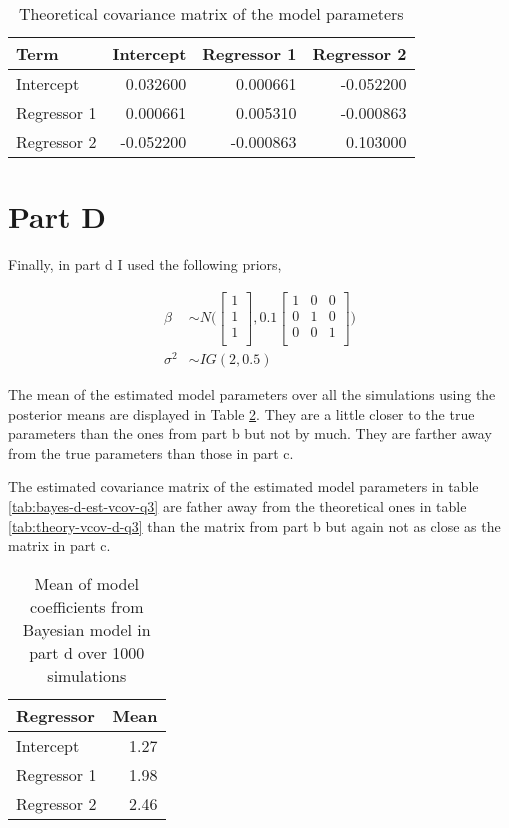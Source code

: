 \documentclass[]{book}
\begin{document}
\begin{table}

\caption{\label{tab:theory-vcov-c-q3}Theoretical covariance matrix of the model parameters}
\centering
\begin{tabular}[t]{lrrr}
\toprule
Term & Intercept & Regressor 1 & Regressor 2\\
\midrule
Intercept & 0.032600 & 0.000661 & -0.052200\\
Regressor 1 & 0.000661 & 0.005310 & -0.000863\\
Regressor 2 & -0.052200 & -0.000863 & 0.103000\\
\bottomrule
\end{tabular}
\end{table}

\hypertarget{part-d-2}{%
\section{Part D}\label{part-d-2}}

Finally, in part d I used the following priors,

\begin{align}
  \beta &\sim N \bigg( 
  \begin{bmatrix}
  1\\
  1\\
  1\\
  \end{bmatrix},
  0.1 \begin{bmatrix}
  1 & 0 & 0\\
  0 & 1 & 0\\
  0 & 0 & 1\\
  \end{bmatrix} \bigg)\\
  \sigma^2 &\sim IG(2, 0.5)
\end{align}

The mean of the estimated model parameters over all the simulations using the posterior means are displayed in Table \ref{tab:bayes-d-mean-coefs-q3}. They are a little closer to the true parameters than the ones from part b but not by much. They are farther away from the true parameters than those in part c.

The estimated covariance matrix of the estimated model parameters in table \ref{tab:bayes-d-est-vcov-q3} are father away from the theoretical ones in table \ref{tab:theory-vcov-d-q3} than the matrix from part b but again not as close as the matrix in part c.

\begin{table}

\caption{\label{tab:bayes-d-mean-coefs-q3}Mean of model coefficients from Bayesian model in part d over 1000 simulations}
\centering
\begin{tabular}[t]{lr}
\toprule
Regressor & Mean\\
\midrule
Intercept & 1.27\\
Regressor 1 & 1.98\\
Regressor 2 & 2.46\\
\bottomrule
\end{tabular}
\end{table}
\end{document}
